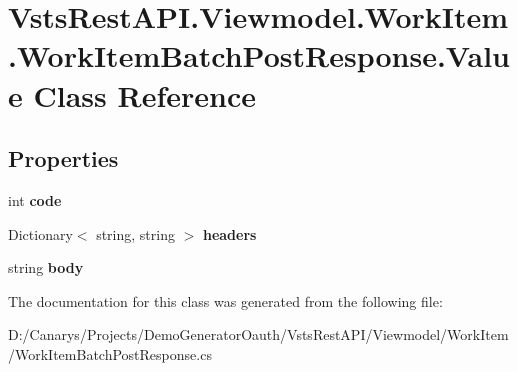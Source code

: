 \hypertarget{class_vsts_rest_a_p_i_1_1_viewmodel_1_1_work_item_1_1_work_item_batch_post_response_1_1_value}{}\section{Vsts\+Rest\+A\+P\+I.\+Viewmodel.\+Work\+Item.\+Work\+Item\+Batch\+Post\+Response.\+Value Class Reference}
\label{class_vsts_rest_a_p_i_1_1_viewmodel_1_1_work_item_1_1_work_item_batch_post_response_1_1_value}
\subsection*{Properties}
\begin{DoxyCompactItemize}
\item 
\mbox{\label{class_vsts_rest_a_p_i_1_1_viewmodel_1_1_work_item_1_1_work_item_batch_post_response_1_1_value_a3600b35f9593daf9e9fd51a8ab26f193}} 
int {\bfseries code}
\item 
\mbox{\label{class_vsts_rest_a_p_i_1_1_viewmodel_1_1_work_item_1_1_work_item_batch_post_response_1_1_value_a578ca8c2d2441e5f4e80ae9f797833a2}} 
Dictionary$<$ string, string $>$ {\bfseries headers}
\item 
\mbox{\label{class_vsts_rest_a_p_i_1_1_viewmodel_1_1_work_item_1_1_work_item_batch_post_response_1_1_value_a9d74cf34e34c90c803cbc36875bca04b}} 
string {\bfseries body}
\end{DoxyCompactItemize}


The documentation for this class was generated from the following file\+:\begin{DoxyCompactItemize}
\item 
D\+:/\+Canarys/\+Projects/\+Demo\+Generator\+Oauth/\+Vsts\+Rest\+A\+P\+I/\+Viewmodel/\+Work\+Item/Work\+Item\+Batch\+Post\+Response.\+cs\end{DoxyCompactItemize}
